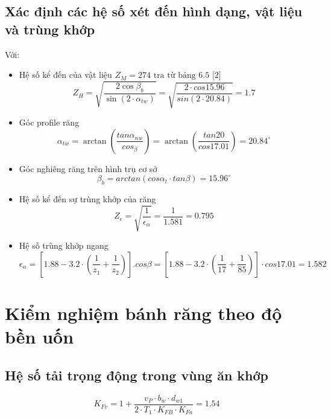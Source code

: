 \subsection{Xác định các hệ số xét đến hình dạng, vật liệu và trùng khớp}
Với:
\begin{itemize}
    \item Hệ số kể đến của vật liệu $Z_M = 274 \text{ tra từ bảng 6.5 [2]}$
    \begin{equation}
    Z_H = \sqrt{\frac{2 \cos \beta_b}{\sin(2\cdot\alpha_{tw})}} = \sqrt{\frac{2\cdot cos15.96}{sin(2\cdot 20.84)}} = 1.7
    \end{equation}
    \item Góc profile răng
    \begin{equation}
    \alpha_{tw} = \arctan \left( \frac{tan\alpha_{nw}}{cos_\beta} \right) = \arctan \left( \frac{tan20}{cos17.01} \right) = 20.84^\circ
    \end{equation}
    \item Góc nghiêng răng trên hình trụ cơ sở
    \begin{equation}
    \beta_b = arctan(cos\alpha_t\cdot tan\beta) = 15.96^\circ
    \end{equation}
    \item Hệ số kể đến sự trùng khớp của răng
    \begin{equation}
    Z_\epsilon = \sqrt{\frac{1}{\epsilon_\alpha}} = \frac{1}{1.581} = 0.795
    \end{equation}
    \item Hệ số trùng khớp ngang 
    \begin{equation}
    \epsilon_\alpha = [1.88-3.2\cdot(\frac{1}{z_1}+\frac{1}{z_2})].cos\beta = [1.88 - 3.2\cdot (\frac{1}{17} + \frac{1}{85})]\cdot cos17.01 = 1.582
    \end{equation}
\end{itemize}
\section{Kiểm nghiệm bánh răng theo độ bền uốn}

\subsection{Hệ số tải trọng động trong vùng ăn khớp}

\begin{equation}
K_{Fv} = 1 + \frac{v_P \cdot b_w \cdot d_{w1}}{2 \cdot T_1 \cdot K_{FB} \cdot K_{Fa}} = 1.54
\end{equation}

